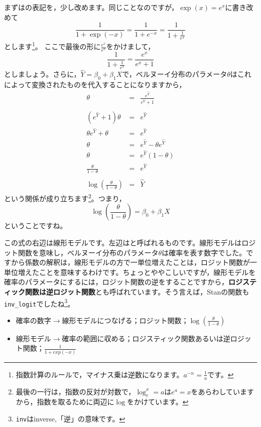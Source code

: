 \documentclass{ltjsbook}
\begin{document}
まずはの表記を，少し改めます。同じことなのですが，$\exp(x) = e^x$に書き改めて
\[ \frac{1}{1+\exp(-x)} = \frac{1}{1+e^{-x}} = \frac{1}{1+\frac{1}{e^x}} \]
とします\footnote{指数計算のルールで，マイナス乗は逆数になります。$a^{-n}=\frac{1}{a}$です。}。
ここで最後の形に$\frac{e^x}{e^x}$をかけまして，
\[ \frac{1}{1+\frac{1}{e^x}}=\frac{e^x}{e^x+1} \]
としましょう。さらに，$\hat{Y} = \beta_0 + \beta_1 X$で，ベルヌーイ分布のパラメータ$\theta$はこれによって変換されたものを代入することになりますから，
\begin{eqnarray*}
	\theta &=& \frac{e^{\hat{Y}}}{e^{\hat{Y}}+1} \\
	&&\\
	(e^{\hat{Y}}+1)\theta & = & e^{\hat{Y}} \\
	\theta e^{\hat{Y}} + \theta &=& e^{\hat{Y}} \\
	\theta & = & e^{\hat{Y}} - \theta e^{\hat{Y}} \\
	\theta & = & e^{\hat{Y}}(1-\theta) \\
	\frac{\theta}{1-\theta} &=& e^{\hat{Y}}\\
	&&\\
	\log\left(\frac{\theta}{1-\theta}\right) &=& \hat{Y}
\end{eqnarray*}
という関係が成り立ちます\footnote{最後の一行は，指数の反対が対数で，$\log_e^x=a$は$e^a=x$をあらわしていますから，指数を取るために両辺に$\log$をかけています。}。つまり，
\[ \log\left(\frac{\theta}{1-\theta}\right) =  \beta_0 + \beta_1 X \]
ということですね。

この式の右辺は線形モデルです。左辺はと呼ばれるものです。線形モデルはロジット関数を意味し，ベルヌーイ分布のパラメータ$\theta$は確率を表す数字でした。ですから係数の解釈は，線形モデルの方で一単位増えたことは，ロジット関数が一単位増えたことを意味するわけです。ちょっとややこしいですが，線形モデルを確率のパラメータにするには，ロジット関数の逆をすることですから，\textbf{ロジスティック関数は逆ロジット関数}とも呼ばれています。そう言えば，Stanの関数も\verb|inv_logit|でしたね\footnote{\texttt{inv}はinverse,「逆」の意味です。}。
\begin{itemize}
	\item 確率の数字$\to$線形モデルにつなげる；ロジット関数；$\log \left( \frac{\theta}{1-\theta} \right) $
	\item 線形モデル$\to$確率の範囲に収める；ロジスティック関数あるいは逆ロジット関数；$\frac{1}{1+exp(-x)}$
\end{itemize}
\end{document}

